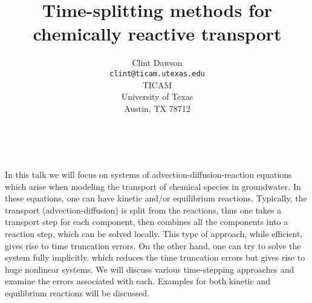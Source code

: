 \documentclass[11pt]{article}
\date{ ~ \hspace{-4mm}}
\title{Time-splitting methods for chemically reactive transport  }
\author{Clint Dawson \\ {\tt  clint@ticam.utexas.edu} \\ TICAM \\ University of Texas \\ Austin, TX  78712}
\begin{document}
\maketitle
\thispagestyle{empty}





 



In this talk we will focus on systems of
advection-diffusion-reaction equations which arise when modeling the
transport of chemical species in groundwater.  In these equations, one
can have kinetic and/or equilibrium reactions.  Typically, the
transport (advection-diffusion) is split from the reactions, thus one
takes a transport step for each component, then combines all the
components into a reaction step, which can be solved locally.  This
type of approach, while efficient, gives rise to time truncation
errors.  On the other hand, one can try to solve the system fully
implicitly, which reduces the time truncation errors but gives rise to
huge nonlinear systems.  We will discuss various time-stepping
approaches and examine the errors associated with each.  Examples for
both kinetic and equilibrium reactions will be discussed.
\end{document}

